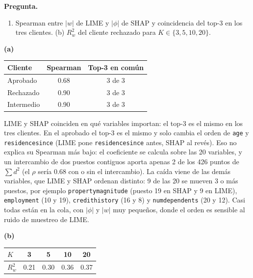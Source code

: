 \documentclass[11pt]{article}
\renewcommand{\_}{\textunderscore\allowbreak{}}
\providecommand{\tightlist}{\setlength{\itemsep}{0pt}\setlength{\parskip}{0pt}}
\begin{document}
\begin{tcolorbox}[colback=yellow!12, colframe=orange!70!black, boxrule=0.5pt, left=4pt, right=4pt]
\textbf{Pregunta.} \begin{enumerate}
\def\labelenumi{(\alph{enumi})}
\tightlist
\item
  Spearman entre \(|w|\) de LIME y \(|\phi|\) de SHAP y coincidencia del top-3 en los tres clientes. (b) \(R^2_w\) del cliente rechazado para \(K\in\{3,5,10,20\}\).
\end{enumerate}
\end{tcolorbox}

\textbf{(a)}

\begin{longtable}[]{@{}lcc@{}}
\toprule\noalign{}
Cliente & Spearman & Top-3 en común \\
\midrule\noalign{}
\endhead
\bottomrule\noalign{}
\endlastfoot
Aprobado & 0.68 & 3 de 3 \\
Rechazado & 0.90 & 3 de 3 \\
Intermedio & 0.90 & 3 de 3 \\
\end{longtable}

LIME y SHAP coinciden en qué variables importan: el top-3 es el mismo en los tres clientes. En el aprobado el top-3 es el mismo y solo cambia el orden de \texttt{age} y \texttt{residence\_since} (LIME pone \texttt{residence\_since} antes, SHAP al revés). Eso no explica su Spearman más bajo: el coeficiente se calcula sobre las 20 variables, y un intercambio de dos puestos contiguos aporta apenas 2 de los 426 puntos de \(\sum d^2\) (el \(\rho\) sería 0.68 con o sin el intercambio). La caída viene de las demás variables, que LIME y SHAP ordenan distinto: 9 de las 20 se mueven 3 o más puestos, por ejemplo \texttt{property\_magnitude} (puesto 19 en SHAP y 9 en LIME), \texttt{employment} (10 y 19), \texttt{credit\_history} (16 y 8) y \texttt{num\_dependents} (20 y 12). Casi todas están en la cola, con \(|\phi|\) y \(|w|\) muy pequeños, donde el orden es sensible al ruido de muestreo de LIME.

\textbf{(b)}

\begin{longtable}[]{@{}lcccc@{}}
\toprule\noalign{}
\(K\) & 3 & 5 & 10 & 20 \\
\midrule\noalign{}
\endhead
\bottomrule\noalign{}
\endlastfoot
\(R^2_w\) & 0.21 & 0.30 & 0.36 & 0.37 \\
\end{longtable}
\end{document}
